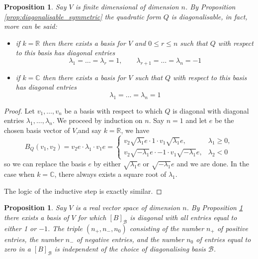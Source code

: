 \documentclass[12pt]{article}
\theoremstyle{plain}
\newtheorem{proposition}[thm]{Proposition}
\theoremstyle{definition}
\newcommand{\bb}[1]{\mathbb{#1}}
\newcommand{\scr}[1]{\mathscr{#1}}
\begin{document}
\begin{proposition}\label{prop:one_negative_one}
Say $V$ is finite dimensional of dimension $n$. By Proposition \ref{prop:diagonalisable_symmetric} the quadratic form $Q$ is diagonalisable, in fact, more can be said:
\begin{itemize}
\item if $k = \bb{R}$ then there exists a basis for $V$ and $0 \leq r \leq n$ such that $Q$ with respect to this basis has diagonal entries
\begin{equation}
\lambda_1 = \hdots = \lambda_r = 1, \qquad \lambda_{r+1} = \hdots = \lambda_n = -1
\end{equation}
\item if $k = \bb{C}$ then there exists a basis for $V$ such that $Q$ with respect to this basis has diagonal entries
\begin{equation}
\lambda_1 = \hdots = \lambda_n = 1
\end{equation}
\end{itemize}
\end{proposition}
\begin{proof}
Let $v_1,\hdots,v_n$ be a basis with respect to which $Q$ is diagonal with diagonal entries $\lambda_1,\hdots,\lambda_n$. We proceed by induction on $n$. Say $n = 1$ and let $e$ be the chosen basis vector of $V$,and say $k = \bb{R}$,  we have
\begin{equation}
B_Q(v_1,v_2) = v_2e\cdot \lambda_1 \cdot v_1 e =
\begin{cases}
v_2 \sqrt{\lambda_1}e\cdot 1 \cdot v_1\sqrt{\lambda_1} e,&\lambda_1 \geq 0,\\
v_2 \sqrt{-\lambda_1}e\cdot -1 \cdot v_1\sqrt{-\lambda_1} e,& \lambda_2 < 0
\end{cases}
\end{equation}
so we can replace the basis $e$ by either $\sqrt{\lambda_1}e$ or $\sqrt{-\lambda_1}e$ and we are done. In the case when $k = \bb{C}$, there always exists a square root of $\lambda_1$.

The logic of the inductive step is exactly similar.
\end{proof}
\begin{proposition}\label{prop:signature}
Say $V$ is a real vector space of dimension $n$. By Proposition \ref{prop:one_negative_one} there exists a basis of $V$ for which $[B]_{\scr{B}}$ is diagonal with all entries equal to either 1 or $-1$. The triple $(n_{+},n_{-},n_0)$ consisting of the number $n_{+}$ of positive entries, the number $n_{-}$ of negative entries, and the number $n_{0}$ of entries equal to zero in a $[B]_{\scr{B}}$ is independent of the choice of diagonalising basis $\scr{B}$. 
\end{proposition}
\end{document}
